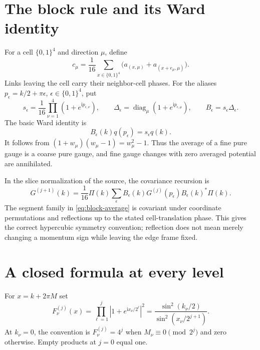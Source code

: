 \documentclass[11pt,oneside,openany]{book}
\theoremstyle{definition}
\theoremstyle{remark}
\newcommand{\ii}{\mathrm i}
\newcommand{\diag}{\operatorname{diag}}
\begin{document}
\section{The block rule and its Ward identity}
For a cell $\{0,1\}^4$ and direction $\mu$, define
\begin{equation}\label{eq:block-average}
c_\mu=\frac1{16}\sum_{x\in\{0,1\}^4}
\bigl(a_{(x,\mu)}+a_{(x+e_\mu,\mu)}\bigr).
\end{equation}
Links leaving the cell carry their neighbor-cell phases. For the aliases $p_\epsilon=k/2+\pi\epsilon$, $\epsilon\in\{0,1\}^4$, put
\begin{equation}\label{eq:alias-B}
s_\epsilon=\frac1{16}\prod_{\nu=1}^{4}(1+e^{\ii p_{\epsilon,\nu}}),
\qquad
\Delta_\epsilon=\diag_\mu(1+e^{\ii p_{\epsilon,\mu}}),
\qquad B_\epsilon=s_\epsilon\Delta_\epsilon.
\end{equation}
The basic Ward identity is
\begin{equation}\label{eq:block-Ward}
B_\epsilon(k)q(p_\epsilon)=s_\epsilon q(k).
\end{equation}
It follows from $(1+w_\mu)(w_\mu-1)=w_\mu^2-1$. Thus the average of a fine pure gauge is a coarse pure gauge, and fine gauge changes with zero averaged potential are annihilated.

In the slice normalization of the source, the covariance recursion is
\begin{equation}\label{eq:tower-rec}
G^{(j+1)}(k)=\frac1{16}\Pi(k)
\sum_{\epsilon}B_\epsilon(k)G^{(j)}(p_\epsilon)B_\epsilon(k)^*\Pi(k).
\end{equation}
The segment family in \cref{eq:block-average} is covariant under coordinate permutations and reflections up to the stated cell-translation phase. This gives the correct hypercubic symmetry convention; reflection does not mean merely changing a momentum sign while leaving the edge frame fixed.

\section{A closed formula at every level}
For $x=k+2\pi M$ set
\begin{equation}\label{eq:Fj}
F_\nu^{(j)}(x)=\prod_{\ell=1}^{j}|1+e^{\ii x_\nu/2^\ell}|^2
=\frac{\sin^2(k_\nu/2)}{\sin^2(x_\nu/2^{j+1})}.
\end{equation}
At $k_\nu=0$, the convention is $F_\nu^{(j)}=4^j$ when $M_\nu\equiv0\pmod{2^j}$ and zero otherwise. Empty products at $j=0$ equal one.
\end{document}
